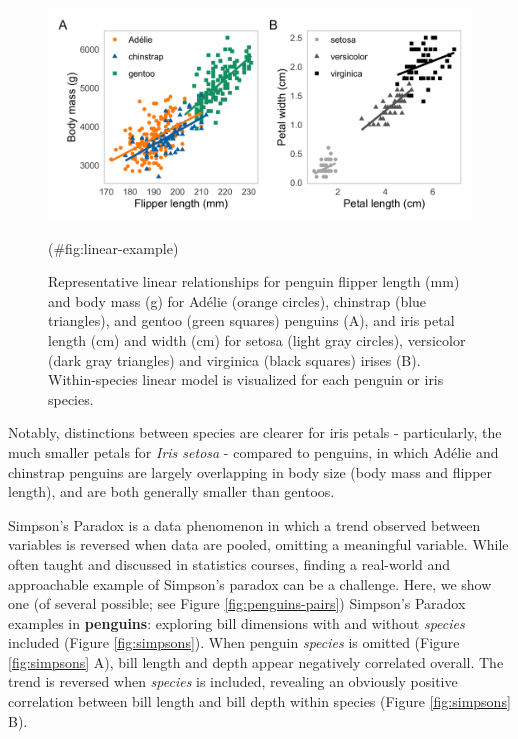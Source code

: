 \begin{Schunk}
\begin{figure}[htbp]

{\centering \includegraphics[width=6in]{fig/linear_example} 

}

\caption[Representative linear relationships for penguin flipper length (mm) and body mass (g) for Adélie (orange circles), chinstrap (blue triangles), and gentoo (green squares) penguins (A), and iris petal length (cm) and width (cm) for setosa (light gray circles), versicolor (dark gray triangles) and virginica (black squares) irises (B)]{Representative linear relationships for penguin flipper length (mm) and body mass (g) for Adélie (orange circles), chinstrap (blue triangles), and gentoo (green squares) penguins (A), and iris petal length (cm) and width (cm) for setosa (light gray circles), versicolor (dark gray triangles) and virginica (black squares) irises (B). Within-species linear model is visualized for each penguin or iris species.}(\#fig:linear-example)
\end{figure}
\end{Schunk}

Notably, distinctions between species are clearer for iris petals - particularly, the much smaller petals for \emph{Iris setosa} - compared to penguins, in which Adélie and chinstrap penguins are largely overlapping in body size (body mass and flipper length), and are both generally smaller than gentoos.

Simpson's Paradox is a data phenomenon in which a trend observed between variables is reversed when data are pooled, omitting a meaningful variable. While often taught and discussed in statistics courses, finding a real-world and approachable example of Simpson's paradox can be a challenge. Here, we show one (of several possible; see Figure \ref{fig:penguins-pairs}) Simpson's Paradox examples in \textbf{penguins}: exploring bill dimensions with and without \emph{species} included (Figure \ref{fig:simpsons}). When penguin \emph{species} is omitted (Figure \ref{fig:simpsons} A), bill length and depth appear negatively correlated overall. The trend is reversed when \emph{species} is included, revealing an obviously positive correlation between bill length and bill depth within species (Figure \ref{fig:simpsons} B).

